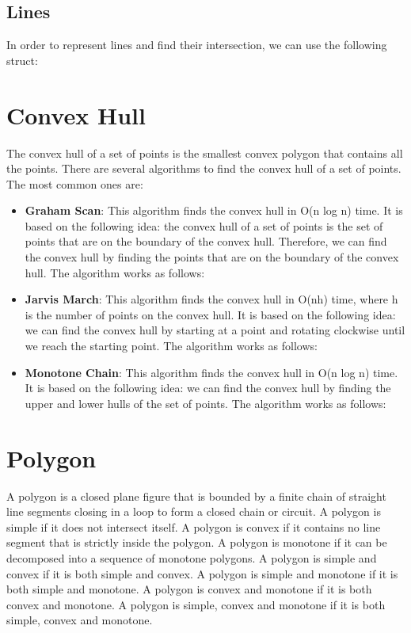 


\subsection{Lines}

In order to represent lines and find their intersection, we can use the following struct:




\section{Convex Hull}

The convex hull of a set of points is the smallest convex polygon that contains all the points. There are several algorithms to find the convex hull of a set of points. The most common ones are:

\begin{itemize}
    \item \textbf{Graham Scan}: This algorithm finds the convex hull in O(n log n) time. It is based on the following idea: the convex hull of a set of points is the set of points that are on the boundary of the convex hull. Therefore, we can find the convex hull by finding the points that are on the boundary of the convex hull. The algorithm works as follows:
    
    \item \textbf{Jarvis March}: This algorithm finds the convex hull in O(nh) time, where h is the number of points on the convex hull. It is based on the following idea: we can find the convex hull by starting at a point and rotating clockwise until we reach the starting point. The algorithm works as follows:
    \item \textbf{Monotone Chain}: This algorithm finds the convex hull in O(n log n) time. It is based on the following idea: we can find the convex hull by finding the upper and lower hulls of the set of points. The algorithm works as follows:
    
\end{itemize}


\section{Polygon}

A polygon is a closed plane figure that is bounded by a finite chain of straight line segments closing in a loop to form a closed chain or circuit. A polygon is simple if it does not intersect itself. A polygon is convex if it contains no line segment that is strictly inside the polygon. A polygon is monotone if it can be decomposed into a sequence of monotone polygons. A polygon is simple and convex if it is both simple and convex. A polygon is simple and monotone if it is both simple and monotone. A polygon is convex and monotone if it is both convex and monotone. A polygon is simple, convex and monotone if it is both simple, convex and monotone.

